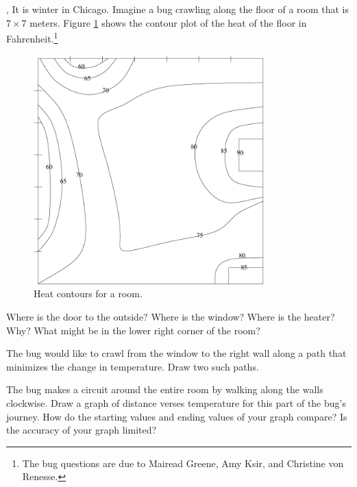 \documentclass[letter]{article}
\begin{document}
	\sep
	It is winter in Chicago.  Imagine a bug crawling along the floor of
	a room that is $7\times 7$ meters.  Figure \ref{heatcontour1} shows the contour plot of the heat
	of the floor in Fahrenheit.\footnote{The bug questions are due to Mairead Greene, Amy Ksir, and Christine von Renesse.}
	\begin{figure}[h!]
		\begin{center}
			\includegraphics[width=3.5in]{heat_contour1.pdf}
		\end{center}
		\vspace{-.5cm}
		\caption{Heat contours for a room.}
		\label{heatcontour1}
	\end{figure}
	\begin{Enum}
		\item Where is the door to the outside?  Where is the window?  Where is the heater? Why?
			What might be in the lower right corner of the room?
		\item The bug would like to crawl from the window to the right wall along a path that minimizes
			the change in temperature.  Draw two such paths.
		\item The bug makes a circuit around the entire room by walking along the walls clockwise.
			Draw a graph of distance verses temperature for this part of the bug's journey.  How
			do the starting values and ending values of your graph compare?  Is the accuracy of your
			graph limited?
	\end{Enum}
	
\end{document}
